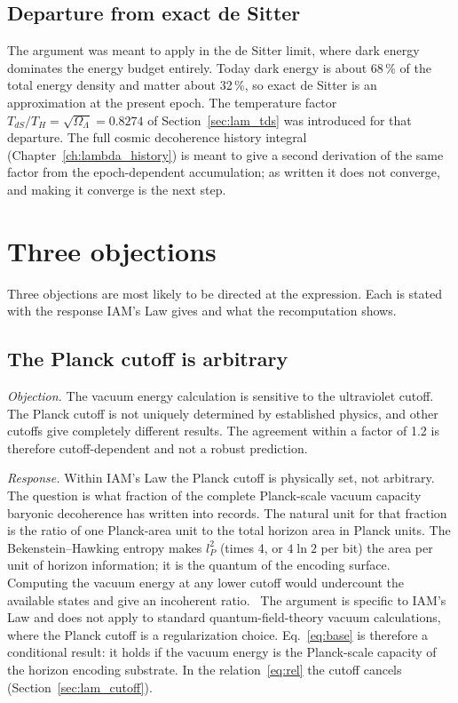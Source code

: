 \subsection{Departure from exact de Sitter}
The argument was meant to apply in the de Sitter limit, where dark energy dominates the energy budget entirely. Today dark energy is
about 68\,\% of the total energy density and matter about 32\,\%, so exact de Sitter is an approximation at the present epoch. The
temperature factor $T_{dS}/T_H=\sqrt{\Omega_\Lambda}=0.8274$ of Section~\ref{sec:lam_tds} was introduced for that departure. The full cosmic decoherence history integral (Chapter~\ref{ch:lambda_history}) is meant to give a second derivation of the same factor from the epoch-dependent accumulation; as written it does not converge, and making it converge is the next step. \openprob

\section{Three objections}\label{sec:lam_obj}
Three objections are most likely to be directed at the expression. Each is stated with the response IAM's Law gives and what the
recomputation shows.

\subsection{The Planck cutoff is arbitrary}
\emph{Objection.} The vacuum energy calculation is sensitive to the ultraviolet cutoff. The Planck cutoff is not uniquely determined by
established physics, and other cutoffs give completely different results. The agreement within a factor of 1.2 is therefore
cutoff-dependent and not a robust prediction. \openprob

\emph{Response.} Within IAM's Law the Planck cutoff is physically set, not arbitrary. The question is what fraction of the complete
Planck-scale vacuum capacity baryonic decoherence has written into records. The natural unit for that fraction is the ratio of one
Planck-area unit to the total horizon area in Planck units. The Bekenstein--Hawking entropy makes $l_P^2$ (times 4, or $4\ln2$ per bit)
the area per unit of horizon information; it is the quantum of the encoding surface. Computing the vacuum energy at any lower cutoff
would undercount the available states and give an incoherent ratio. \interp\ The argument is specific to IAM's Law and does not apply
to standard quantum-field-theory vacuum calculations, where the Planck cutoff is a regularization choice. Eq.~\eqref{eq:base} is
therefore a conditional result: it holds if the vacuum energy is the Planck-scale capacity of the horizon encoding substrate. In the
relation~\eqref{eq:rel} the cutoff cancels (Section~\ref{sec:lam_cutoff}).

